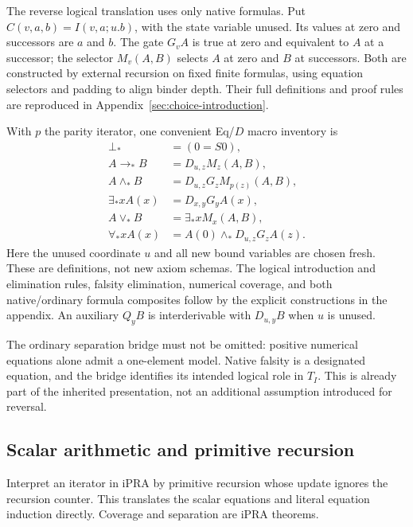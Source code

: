 The reverse logical translation uses only native formulas. Put
$C(v,a,b)=I(v,a;u.b)$, with the state variable unused. Its values at zero
and successors are $a$ and $b$. The gate $G_vA$ is true at zero and
equivalent to $A$ at a successor; the selector $M_v(A,B)$ selects $A$
at zero and $B$ at successors. Both are constructed by external
recursion on fixed finite formulas, using equation selectors and
padding to align binder depth. Their full definitions and proof rules
are reproduced in Appendix~\ref{sec:choice-introduction}.

With $p$ the parity iterator, one convenient Eq/$D$ macro inventory is
\[
\begin{aligned}
 \bot_*&=(0=S0),\\
 A\to_*B&=D_{u,z}M_z(A,B),\\
 A\land_*B&=D_{u,z}G_zM_{p(z)}(A,B),\\
 \exists_*x A(x)&=D_{x,y}G_yA(x),\\
 A\lor_*B&=\exists_*x M_x(A,B),\\
 \forall_*x A(x)&=A(0)\land_*D_{u,z}G_zA(z).
\end{aligned}
\]
Here the unused coordinate $u$ and all new bound variables are chosen
fresh. These are definitions, not new axiom schemas. The logical
introduction and elimination rules, falsity elimination, numerical
coverage, and both native/ordinary formula composites follow by the
explicit constructions in the appendix. An auxiliary $Q_yB$ is
interderivable with $D_{u,y}B$ when $u$ is unused.

The ordinary separation bridge must not be omitted: positive numerical
equations alone admit a one-element model. Native falsity is a designated
equation, and the bridge identifies its intended logical role in $T_I$.
This is already part of the inherited presentation, not an additional
assumption introduced for reversal.

\subsection{Scalar arithmetic and primitive recursion}

Interpret an iterator in iPRA by primitive recursion whose update ignores
the recursion counter. This translates the scalar equations and literal
equation induction directly. Coverage and separation are iPRA theorems.

